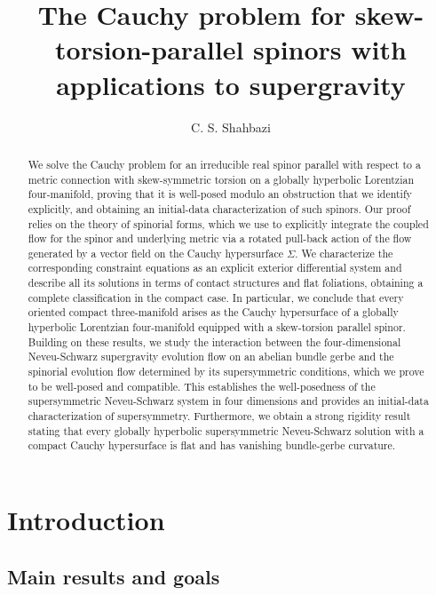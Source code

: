\documentclass[10pt,reqno,a4paper]{amsart}
\title[Cauchy problem for skew-torsion-parallel spinors]{The Cauchy problem for skew-torsion-parallel spinors with applications to supergravity}
\author{C. S. Shahbazi}
\date{}
\theoremstyle{plain}
\theoremstyle{definition}
\theoremstyle{remark}
\theoremstyle{remark}
\renewcommand{\(}{ (}
\renewcommand{\)}{ )}
\begin{document}
\begin{abstract}
We solve the Cauchy problem for an irreducible real spinor parallel with respect to a metric connection with skew-symmetric torsion on a globally hyperbolic Lorentzian four-manifold, proving that it is well-posed modulo an obstruction that we identify explicitly, and obtaining an initial-data characterization of such spinors. Our proof relies on the theory of spinorial forms, which we use to explicitly integrate the coupled flow for the spinor and underlying metric via a rotated pull-back action of the flow generated by a vector field on the Cauchy hypersurface $\Sigma$. We characterize the corresponding constraint equations as an explicit exterior differential system and describe all its solutions in terms of contact structures and flat foliations, obtaining a complete classification in the compact case. In particular, we conclude that every oriented compact three-manifold arises as the Cauchy hypersurface of a globally hyperbolic Lorentzian four-manifold equipped with a skew-torsion parallel spinor. Building on these results, we study the interaction between the four-dimensional Neveu-Schwarz supergravity evolution flow on an abelian bundle gerbe and the spinorial evolution flow determined by its supersymmetric conditions, which we prove to be well-posed and compatible. This establishes the well-posedness of the supersymmetric Neveu-Schwarz system in four dimensions and provides an initial-data characterization of supersymmetry. Furthermore, we obtain a strong rigidity result stating that every globally hyperbolic supersymmetric Neveu-Schwarz solution with a compact Cauchy hypersurface is flat and has vanishing bundle-gerbe curvature.
\end{abstract}

\maketitle
  

\setcounter{tocdepth}{1}
\tableofcontents 


%
%

\section{Introduction}
\label{chapter:introduction} 

%
%


%

\subsection*{Main results and goals} 
\end{document}
